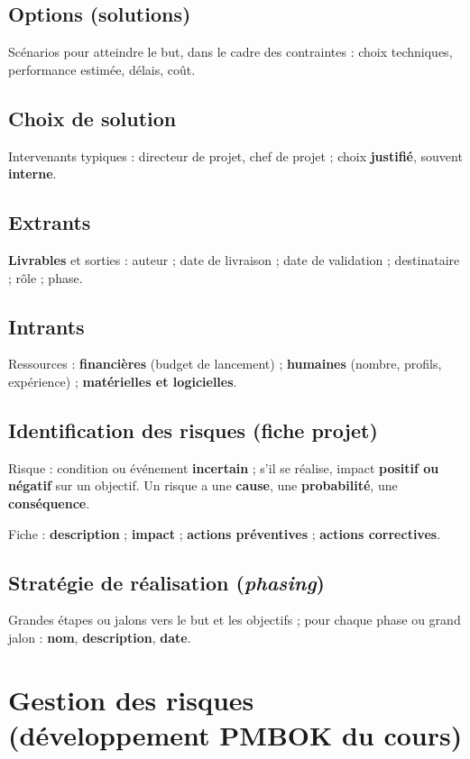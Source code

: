 \documentclass[11pt,a4paper]{article}
\begin{document}
\subsection{Options (solutions)}
Scénarios pour atteindre le but, dans le cadre des contraintes : choix techniques, performance estimée, délais, coût.

\subsection{Choix de solution}
Intervenants typiques : directeur de projet, chef de projet ; choix \textbf{justifié}, souvent \textbf{interne}.

\subsection{Extrants}
\textbf{Livrables} et sorties : auteur ; date de livraison ; date de validation ; destinataire ; rôle ; phase.

\subsection{Intrants}
Ressources : \textbf{financières} (budget de lancement) ; \textbf{humaines} (nombre, profils, expérience) ; \textbf{matérielles et logicielles}.

\subsection{Identification des risques (fiche projet)}
Risque : condition ou événement \textbf{incertain} ; s'il se réalise, impact \textbf{positif ou négatif} sur un objectif. Un risque a une \textbf{cause}, une \textbf{probabilité}, une \textbf{conséquence}.

Fiche : \textbf{description} ; \textbf{impact} ; \textbf{actions préventives} ; \textbf{actions correctives}.

\subsection{Stratégie de réalisation (\emph{phasing})}
Grandes étapes ou jalons vers le but et les objectifs ; pour chaque phase ou grand jalon : \textbf{nom}, \textbf{description}, \textbf{date}.

\section{Gestion des risques (développement PMBOK du cours)}
\end{document}
